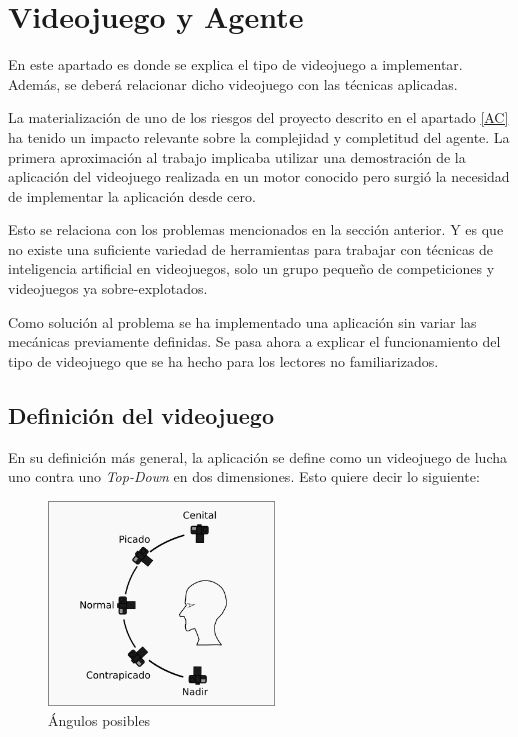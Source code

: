\section{Videojuego y Agente}

En este apartado es donde se explica el tipo de videojuego a implementar. Además, se deberá relacionar dicho videojuego con las técnicas aplicadas.

\bigskip

La materialización de uno de los riesgos del proyecto descrito en el apartado \ref{AC} ha tenido un impacto relevante sobre la complejidad y completitud del agente. La primera aproximación al trabajo implicaba utilizar una demostración de la aplicación del videojuego realizada en un motor conocido pero surgió la necesidad de implementar la aplicación desde cero.

\bigskip

Esto se relaciona con los problemas mencionados en la sección anterior. Y es que no existe una suficiente variedad de herramientas para trabajar con técnicas de inteligencia artificial en videojuegos, solo un grupo pequeño de competiciones y videojuegos ya sobre-explotados.

\bigskip

Como solución al problema se ha implementado una aplicación sin variar las mecánicas previamente definidas. Se pasa ahora a explicar el funcionamiento del tipo de videojuego que se ha hecho para los lectores no familiarizados.

\subsection{Definición del videojuego}

En su definición más general, la aplicación se define como un videojuego de lucha uno contra uno \textit{Top-Down} en dos dimensiones. Esto quiere decir lo siguiente:

\begin{figure}
	\centerline{\includegraphics[width=6cm]{otros/manual/angulos.png}}
	\caption{Ángulos posibles}
	\label{mec:angulos}
\end{figure}

